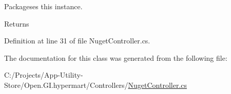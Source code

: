 Packageses this instance. 

\begin{DoxyReturn}{Returns}

\end{DoxyReturn}


Definition at line 31 of file Nuget\+Controller.\+cs.



The documentation for this class was generated from the following file\+:\begin{DoxyCompactItemize}
\item 
C\+:/\+Projects/\+App-\/\+Utility-\/\+Store/\+Open.\+G\+I.\+hypermart/\+Controllers/\hyperlink{_nuget_controller_8cs}{Nuget\+Controller.\+cs}\end{DoxyCompactItemize}
